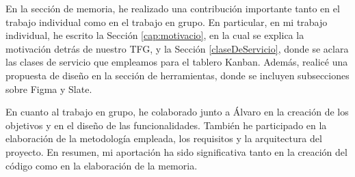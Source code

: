 En la sección de memoria, he realizado una contribución importante tanto en el trabajo individual como en el trabajo en grupo. En particular, en mi trabajo individual, he escrito la Sección \ref{cap:motivacio}, en la cual se explica la motivación detrás de nuestro TFG, y la Sección \ref{claseDeServicio}, donde se aclara las clases de servicio que empleamos para el tablero Kanban. Además, realicé una propuesta de diseño en la sección de herramientas, donde se incluyen subsecciones sobre Figma y Slate.

En cuanto al trabajo en grupo, he colaborado junto a Álvaro en la creación de los objetivos y en el diseño de las funcionalidades. También he participado en la elaboración de la metodología empleada, los requisitos y la arquitectura del proyecto. En resumen, mi aportación ha sido significativa tanto en la creación del código como en la elaboración de la memoria.